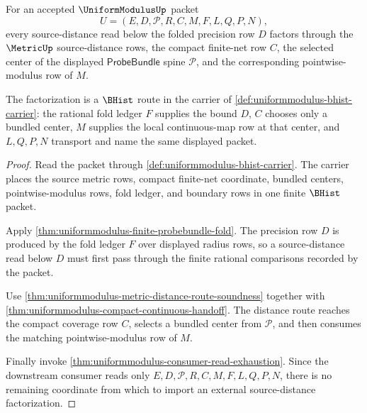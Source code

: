 \begin{theorem}
\label{thm:uniformmodulus-metric-source-distance-factorization}
For an accepted $\UniformModulusUp$ packet
$$
U=(E,D,\mathcal{P},R,C,M,F,L,Q,P,N),
$$
every source-distance read below the folded precision row $D$ factors through the $\MetricUp$ source-distance rows, the compact finite-net row $C$, the selected center of the displayed $\mathsf{ProbeBundle}$ spine $\mathcal{P}$, and the corresponding pointwise-modulus row of $M$.

The factorization is a $\BHist$ route in the carrier of \autoref{def:uniformmodulus-bhist-carrier}: the rational fold ledger $F$ supplies the bound $D$, $C$ chooses only a bundled center, $M$ supplies the local continuous-map row at that center, and $L,Q,P,N$ transport and name the same displayed packet.
\end{theorem}
\begin{proof}
Read the packet through \autoref{def:uniformmodulus-bhist-carrier}. The carrier places the source metric rows, compact finite-net coordinate, bundled centers, pointwise-modulus rows, fold ledger, and boundary rows in one finite $\BHist$ packet.

Apply \autoref{thm:uniformmodulus-finite-probebundle-fold}. The precision row $D$ is produced by the fold ledger $F$ over displayed radius rows, so a source-distance read below $D$ must first pass through the finite rational comparisons recorded by the packet.

Use \autoref{thm:uniformmodulus-metric-distance-route-soundness} together with \autoref{thm:uniformmodulus-compact-continuous-handoff}. The distance route reaches the compact coverage row $C$, selects a bundled center from $\mathcal{P}$, and then consumes the matching pointwise-modulus row of $M$.

Finally invoke \autoref{thm:uniformmodulus-consumer-read-exhaustion}. Since the downstream consumer reads only $E,D,\mathcal{P},R,C,M,F,L,Q,P,N$, there is no remaining coordinate from which to import an external source-distance factorization.
\end{proof}

